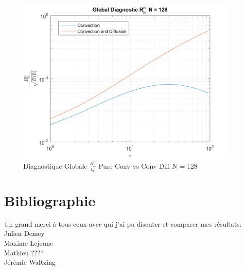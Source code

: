 \documentclass{article}
\begin{document}
\begin{figure}[H]
    \centering
    \includegraphics[scale=0.45]{img/fig8d.png}
    \caption{Diagnostique Globale $\frac{R_h^n}{Q}$ Pure-Conv vs Conv-Diff N = 128}
    \label{fig8d}
\end{figure}
\section{Bibliographie}
Un grand merci à tous ceux avec qui j'ai pu discuter et comparer mes résultats:\\
Julien Demey \\
Maxime Lejeune \\
Mathieu ????\\
Jérémie Waltzing \\
\end{document}
